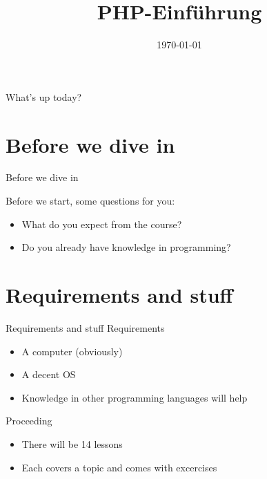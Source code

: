 	


\newcommand{\topic}{
	PHP-Einführung
}

\title{\topic}
\date{\today}



\maketitle

\begin{frame}{What's up today?}
	\tableofcontents
\end{frame}

\section{Before we dive in}

\begin{frame}{Before we dive in}

	Before we start, some questions for you:
	\pause
	\begin{itemize}
        \item What do you expect from the course? 	\pause
		\item Do you already have knowledge in programming?
	\end{itemize}
\end{frame}


\section{Requirements and stuff}

\begin{frame}{Requirements and stuff}
	Requirements
	
	\begin{itemize}
        \item A computer (obviously) 	\pause
		\item A decent OS 	\pause
		\item Knowledge in other programming languages will help 	\pause
	\end{itemize}
	Proceeding
	
	\begin{itemize}
		\item There will be 14 lessons
		\item Each covers a topic and comes with excercises
	\end{itemize}
\end{frame}

